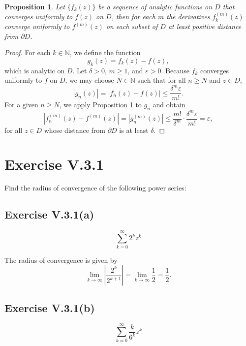 \documentclass[12pt]{article}
\newenvironment{problem}
    {\begin{lrbox}{\mybox}\begin{minipage}{0.98\textwidth}}
    {\end{minipage}\end{lrbox}\framebox[\textwidth]{\usebox{\mybox}}}
\newtheorem{proposition}{Proposition}
\newcommand{\N}{\mathbb{N}}
\newcommand{\eps}{\varepsilon}
\newcommand{\bd}{\partial}
\newcommand{\klim}{\lim\limits_{k \to \infty}}
\begin{document}
\newpage
\begin{proposition}
    Let $\{f_k(z)\}$ be a sequence of analytic functions on $D$ that converges uniformly to $f(z)$ on $D$, then for each $m$ the derivatives $f_k^{(m)}(z)$ converge uniformly to $f^{(m)}(z)$ on each subset of $D$ at least positive distance from $\bd D$.
\end{proposition}

\begin{proof}
    For each $k \in \N$, we define the function
    \[
        g_k(z) = f_k(z) - f(z),
    \]
    which is analytic on $D$. Let $\delta > 0$, $m \geq 1$, and $\eps > 0$. Because $f_k$ converges uniformly to $f$ on $D$, we may choose $N \in \N$ such that for all $n \geq N$ and $z \in D$,
    \[
        |g_n(z)| = |f_n(z) - f(z)| \leq \frac{\delta^m \eps}{m!}.
    \]
    For a given $n \geq N$, we apply Proposition 1 to $g_n$ and obtain
    \[
        \left| f_n^{(m)}(z) - f^{(m)}(z) \right| = \left| g_n^{(m)}(z) \right| \leq \frac{m!}{\delta^m} \cdot \frac{\delta^m \eps}{m!} = \eps,
    \]
    for all $z \in D$ whose distance from $\bd D$ is at least $\delta$.
    
\end{proof}

\newpage
\section{Exercise V.3.1}
\begin{problem}
    Find the radius of convergence of the following power series:
\end{problem}

\subsection{Exercise V.3.1(a)}
\begin{problem}
    \[
        \sum_{k=0}^\infty 2^k z^k
    \]
\end{problem}
\medskip

The radius of convergence is given by
\[
    \klim \left| \frac{2^k}{2^{k+1}} \right| = \klim \frac12 = \frac12.
\]

\subsection{Exercise V.3.1(b)}
\begin{problem}
    \[
        \sum_{k=0}^\infty \frac{k}{6^k} z^k
    \]
\end{problem}
\medskip
\end{document}
